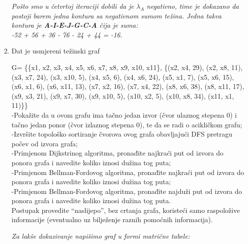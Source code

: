 \documentclass[12pt]{article}
\begin{document}
\begin{enumerate}
\begin{center}
      \textit{Pošto smo u četvrtoj iteraciji dobili da je $\lambda_A$ negativno, time je dokazano da postoji barem jedna kontura sa negativnom sumom težina. Jedna takva kontura je \textbf{A-I-E-J-G-C-A} čija je suma:\\ -52 + 56 + 36 - 76 - 24 + 44 = -16.}
      
\end{center}
	\item Dat je usmjereni težinski graf

G= \{\{x1, x2, x3, x4, x5, x6, x7, x8, x9, x10, x11\}, \{(x2, x4, 29), (x2, x8, 11), (x3, x7, 24), (x3, x10, 5), (x4, x5, 6), (x4, x6, 24), (x5, x1, 7), (x5, x6, 15), (x6, x1, 6), (x6, x11, 13), (x7, x2, 16), (x7, x4, 22), (x8, x6, 38), (x8, x11, 17), (x9, x3, 21), (x9, x7, 30), (x9, x10, 5), (x10, x2, 5), (x10, x8, 34), (x11, x1, 11)\}\}\\
-Pokažite da u ovom grafu ima tačno jedan izvor (čvor ulaznog stepena 0) i tačno jedan ponor (čvor izlaznog stepena 0), te da se radi o acikličkom grafu;\\
-Izvršite topološko sortiranje čvorova ovog grafa obavljajući DFS pretragu počev od izvora grafa;\\
-Primjenom Dijkstrinog algoritma, pronađite najkraći put od izvora do ponora grafa i navedite koliko iznosi dužina tog puta;\\
-Primjenom Bellman-Fordovog algoritma, pronađite najkraći put od izvora do ponora grafa i navedite koliko iznosi dužina tog puta;\\
-Primjenom Bellman-Fordovog algoritma, pronađite najduži put od izvora do ponora grafa i navedite koliko iznosi dužina tog puta.\\
Postupak provedite “naslijepo”, bez crtanja grafa, koristeći samo raspoložive informacije (eventualno uz bilježenje raznih pomoćnih informacija).\\
\begin{center}
    \textit{Za lakše dokazivanje napišimo graf u formi matrične tabele:\\}
    

\end{center}
\end{enumerate}
\end{document}
